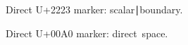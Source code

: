 \documentclass{article}
\begin{document}
Direct U+2223 marker: scalar∣boundary.

Direct U+00A0 marker: direct space.



\end{document}
